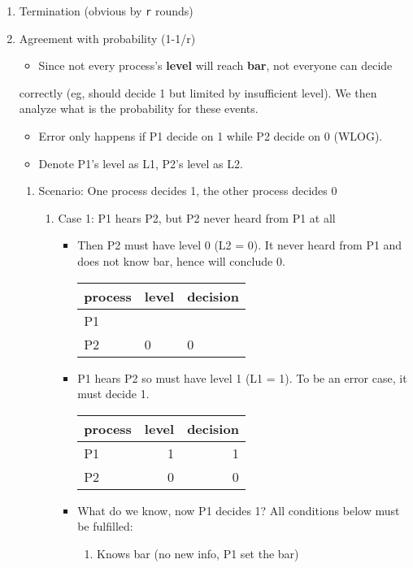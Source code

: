 \documentclass[11pt]{article}
\begin{document}
\begin{enumerate}
\begin{enumerate}
\begin{enumerate}
\item Termination (obvious by \texttt{r} rounds)
\label{sec:org76128cb}
\item Agreement with probability (1-1/r)
\label{sec:org0770620}
\begin{itemize}
\item Since not every process's \textbf{level} will reach \textbf{bar}, not everyone can decide
\end{itemize}
correctly (eg, should decide 1 but limited by insufficient level). We then
analyze what is the probability for these events.
\begin{itemize}
\item Error only happens if P1 decide on 1 while P2 decide on 0 (WLOG).
\item Denote P1's level as L1, P2's level as L2.
\end{itemize}
\begin{enumerate}
\item Scenario: One process decides 1, the other process decides 0
\label{sec:org97583e4}
\begin{enumerate}
\item Case 1: P1 hears P2, but P2 never heard from P1 at all
\label{sec:orgf56b3af}
\begin{itemize}
\item Then P2 must have level 0 (L2 = 0). It never heard from P1 and does not know
bar, hence will conclude 0.
\begin{center}
\begin{tabular}{lll}
process & level & decision\\
\hline
P1 &  & \\
P2 & 0 & 0\\
\end{tabular}
\end{center}
\item P1 hears P2 so must have level 1 (L1 = 1). To be an error case, it must
decide 1.
\begin{center}
\begin{tabular}{lrr}
process & level & decision\\
\hline
P1 & 1 & 1\\
P2 & 0 & 0\\
\end{tabular}
\end{center}
\item What do we know, now P1 decides 1? All conditions below must be fulfilled:
\begin{enumerate}
\item Knows bar (no new info, P1 set the bar)

\end{enumerate}
\end{itemize}
\end{enumerate}
\end{enumerate}
\end{enumerate}
\end{enumerate}
\end{enumerate}
\end{document}
